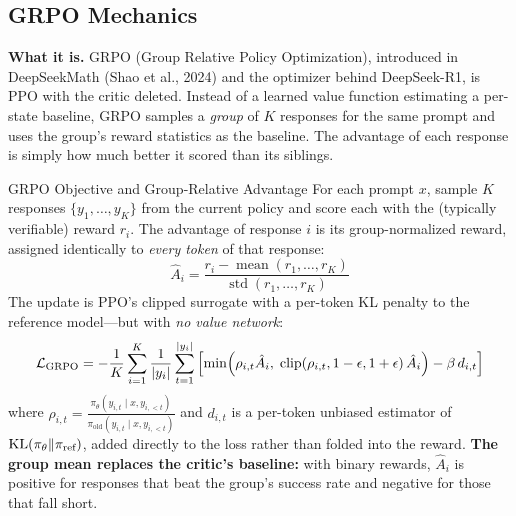 \subsection{GRPO Mechanics}

\textbf{What it is.} GRPO (Group Relative Policy Optimization), introduced in DeepSeekMath (Shao et al., 2024) and the optimizer behind DeepSeek-R1, is PPO with the critic deleted. Instead of a learned value function estimating a per-state baseline, GRPO samples a \textit{group} of $K$ responses for the same prompt and uses the group's reward statistics as the baseline. The advantage of each response is simply how much better it scored than its siblings.

\begin{mathresult}{GRPO Objective and Group-Relative Advantage}
For each prompt $x$, sample $K$ responses $\{y_1, \ldots, y_K\}$ from the current policy and score each with the (typically verifiable) reward $r_i$. The advantage of response $i$ is its group-normalized reward, assigned identically to \textit{every token} of that response:
\begin{equation}
\hat{A}_i = \frac{r_i - \operatorname{mean}(r_1, \ldots, r_K)}{\operatorname{std}(r_1, \ldots, r_K)}
\end{equation}
The update is PPO's clipped surrogate with a per-token KL penalty to the reference model---but with \textit{no value network}:
\begin{equation}
\mathcal{L}_{\text{GRPO}} = -\frac{1}{K}\sum_{i=1}^{K} \frac{1}{|y_i|}\sum_{t=1}^{|y_i|} \left[\min\!\left(\rho_{i,t}\hat{A}_i,\; \text{clip}\!\left(\rho_{i,t}, 1-\epsilon, 1+\epsilon\right)\hat{A}_i\right) - \beta\, d_{i,t}\right]
\end{equation}
where $\rho_{i,t} = \frac{\pi_\theta(y_{i,t} \mid x, y_{i,<t})}{\pi_{\text{old}}(y_{i,t} \mid x, y_{i,<t})}$ and $d_{i,t}$ is a per-token unbiased estimator of $\operatorname{KL}(\pi_\theta \| \pi_{\text{ref}})$, added directly to the loss rather than folded into the reward. \textbf{The group mean replaces the critic's baseline:} with binary rewards, $\hat{A}_i$ is positive for responses that beat the group's success rate and negative for those that fall short.
\end{mathresult}

